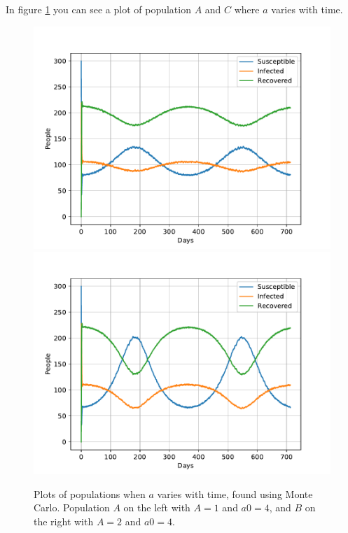 \documentclass[a4paper]{article}
\begin{document}
	In figure \ref{opp_d0_MC} you can see a plot of population $A$ and $C$ where $a$ varies with time. 

	\begin{figure}[!htb]
		\centering 
		\includegraphics[scale=0.56]{../plots/opp_d_A_MC.pdf}
		\includegraphics[scale=0.56]{../plots/opp_d_C_MC.pdf}
		\caption{Plots of populations when $a$ varies with time, found using Monte Carlo. Population $A$ on the left with $A=1$ and $a0=4$, and $B$ on the right with $A=2$ and $a0=4$.}
		\label{opp_d0_MC}
	\end{figure}
	
\end{document}
